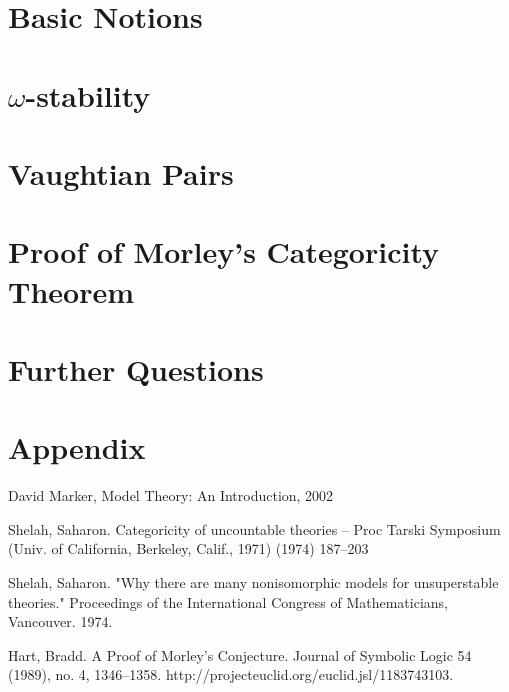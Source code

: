 \documentclass[12pt]{article}
\theoremstyle{definition}
\theoremstyle{definition}
\theoremstyle{plain}
\theoremstyle{remark}
\numberwithin{equation}{section}
\begin{document}

%
%
\pagestyle{myheadings} \markright{}

\section{Basic Notions}


\section{\(\omega\)-stability}


\section{Vaughtian Pairs}


\section{Proof of Morley's Categoricity Theorem}


\section{Further Questions}


\appendix
\section{Appendix}


\begin{thebibliography} \small
%
 David Marker, Model Theory: An Introduction, 2002

 Shelah, Saharon. Categoricity of uncountable theories -- Proc Tarski Symposium (Univ. of California, Berkeley, Calif., 1971) (1974) 187--203

 Shelah, Saharon. "Why there are many nonisomorphic models for unsuperstable theories." Proceedings of the International Congress of Mathematicians, Vancouver. 1974.

Hart, Bradd. A Proof of Morley's Conjecture. Journal of Symbolic Logic 54 (1989), no. 4, 1346--1358. http://projecteuclid.org/euclid.jsl/1183743103.
%
\end{thebibliography}
\end{document}
